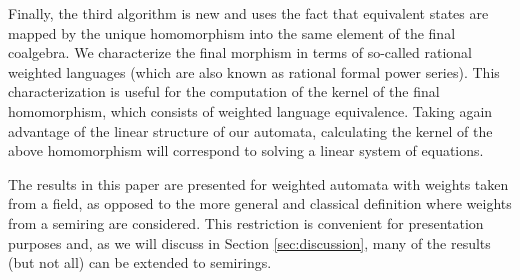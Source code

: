 \documentclass[3p]{elsarticle}
\newcommand{\transp}{{}^{\mathrm{t}}}  %
\newcommand{\dual}[1]{ {#1}^\star}     %
\newcommand{\kernel}{\mathrm{ker}} %
\newcommand{\Span}{\mathrm{span}}  %
\newcommand{\mik}[1]{\marginpar{ \textbf{MiB:} {\footnotesize #1}}} %
\newcommand{\reals}{{\mathbb{R}}}              %
\begin{document}

Finally, the third algorithm is new and uses the fact that equivalent states
are mapped by the unique homomorphism into the same element of the final
coalgebra.  We characterize the final morphism
in terms of so-called rational weighted languages
(which are also known as rational formal power series).
This characterization is useful for the computation
of the kernel of the final homomorphism, which
consists of weighted language equivalence.
Taking again advantage of the linear structure of our
automata, calculating the kernel of the above homomorphism will correspond
to solving a linear system of equations.

The results in this paper are  presented  for weighted automata with
weights taken from a field, as opposed to the more general and classical
definition where weights from a semiring are considered. This restriction
is convenient for presentation purposes and, as we will discuss in
Section \ref{sec:discussion}, many of the results (but not all) can be
extended to semirings.



%
\end{document}
